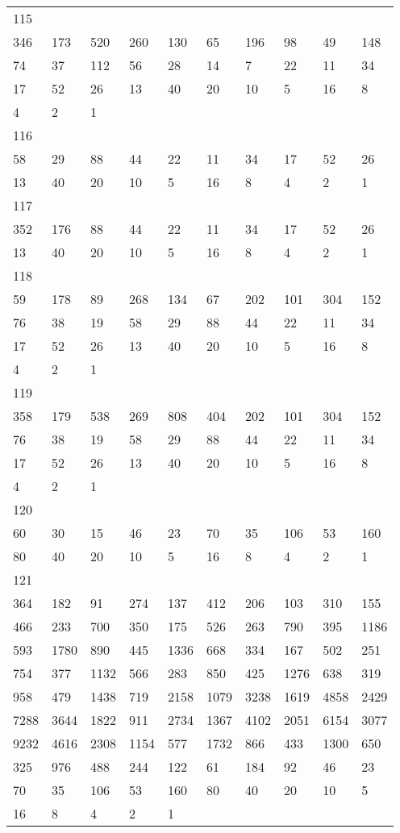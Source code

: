 \begin{longtable}{*{10}{l}}
115&&&&&&&&&\\
346& 173& 520& 260& 130& 65& 196& 98& 49& 148\\
74& 37& 112& 56& 28& 14& 7& 22& 11& 34\\
17& 52& 26& 13& 40& 20& 10& 5& 16& 8\\
4& 2& 1& \\

116&&&&&&&&&\\
58& 29& 88& 44& 22& 11& 34& 17& 52& 26\\
13& 40& 20& 10& 5& 16& 8& 4& 2& 1\\

117&&&&&&&&&\\
352& 176& 88& 44& 22& 11& 34& 17& 52& 26\\
13& 40& 20& 10& 5& 16& 8& 4& 2& 1\\

118&&&&&&&&&\\
59& 178& 89& 268& 134& 67& 202& 101& 304& 152\\
76& 38& 19& 58& 29& 88& 44& 22& 11& 34\\
17& 52& 26& 13& 40& 20& 10& 5& 16& 8\\
4& 2& 1& \\

119&&&&&&&&&\\
358& 179& 538& 269& 808& 404& 202& 101& 304& 152\\
76& 38& 19& 58& 29& 88& 44& 22& 11& 34\\
17& 52& 26& 13& 40& 20& 10& 5& 16& 8\\
4& 2& 1& \\

120&&&&&&&&&\\
60& 30& 15& 46& 23& 70& 35& 106& 53& 160\\
80& 40& 20& 10& 5& 16& 8& 4& 2& 1\\

121&&&&&&&&&\\
364& 182& 91& 274& 137& 412& 206& 103& 310& 155\\
466& 233& 700& 350& 175& 526& 263& 790& 395& 1186\\
593& 1780& 890& 445& 1336& 668& 334& 167& 502& 251\\
754& 377& 1132& 566& 283& 850& 425& 1276& 638& 319\\
958& 479& 1438& 719& 2158& 1079& 3238& 1619& 4858& 2429\\
7288& 3644& 1822& 911& 2734& 1367& 4102& 2051& 6154& 3077\\
9232& 4616& 2308& 1154& 577& 1732& 866& 433& 1300& 650\\
325& 976& 488& 244& 122& 61& 184& 92& 46& 23\\
70& 35& 106& 53& 160& 80& 40& 20& 10& 5\\
16& 8& 4& 2& 1& \\


\end{longtable}
